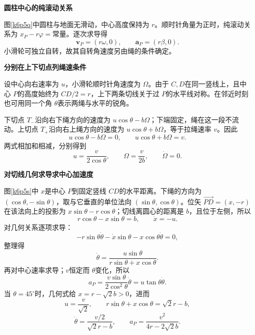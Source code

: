 \begin{solution}\textbf{圆柱中心的纯滚动关系}\par
图\ref{k6p5q}中圆柱与地面无滑动，中心高度保持为 $r$。顺时针角量为正时，纯滚动关系为 $x_P-r\varphi=\text{常量}$。逐次求导得
\[\boxed{\bm v_P=(r\omega,0),\qquad
          \bm a_P=(r\beta,0)}.\]
小滑轮可独立自转，故其自转角速度另由绳的条件确定。


\par\medskip{}\noindent\textbf{分别在上下切点列绳速条件}\par
设中心向右速率为 $u$，小滑轮顺时针角速度为 $\Omega$。由于 $C,D$在同一竖线上，且中心 $P$的高度始终为 $CD/2=r$，上下两条切线关于过 $P$的水平线对称。在邻近时刻也可用同一个角 $\theta$表示两绳与水平的锐角。

下切点 $T_-$沿向右下绳方向的速度为 $u\cos\theta-b\Omega$；下端固定，绳在这一段不流动。上切点 $T_+$沿向右上绳方向的速度为 $u\cos\theta+b\Omega$，等于拉绳速率 $v$。因此
\[u\cos\theta-b\Omega=0,\qquad
  u\cos\theta+b\Omega=v.\]
两式相加和相减，分别得到
\[u=\frac{v}{2\cos\theta},\qquad
\Omega=\frac{v}{2b},\qquad \dot\Omega=0.\]

\par\medskip{}\noindent\textbf{对切线几何求导求中心加速度}\par
图\ref{k6p5s}中 $x$是中心 $P$到固定竖线 $CD$的水平距离。下绳的方向为 $(\cos\theta,-\sin\theta)$，取与它垂直的单位法向 $(\sin\theta,\cos\theta)$。位矢 $\overrightarrow{PD}=(x,-r)$在该法向上的投影为 $x\sin\theta-r\cos\theta$；切线离圆心的距离是 $b$，且位于左侧，所以
\[r\cos\theta-x\sin\theta=b,\qquad \dot x=-u.\]
对几何关系逐项求导：
\[-r\sin\theta\dot\theta
   -\dot x\sin\theta-x\cos\theta\dot\theta=0,\]
整理得
\[\dot\theta=\frac{u\sin\theta}{r\sin\theta+x\cos\theta}.\]
再对中心速率求导；$v$恒定而 $\theta$变化，所以
\[a_P=\frac{v\sin\theta}{2\cos^2\theta}\dot\theta
     =u\tan\theta\dot\theta.\]
当 $\theta=45^\circ$时，几何式给 $x=r-\sqrt2b>0$，进而
\[u=\frac v{\sqrt2},\qquad
r\sin\theta+x\cos\theta=\sqrt2r-b,\]
\[\dot\theta=\frac{v/2}{\sqrt2r-b},\qquad
\boxed{a_P=\frac{v^2}{4r-2\sqrt2b}}.\]



\end{solution}
